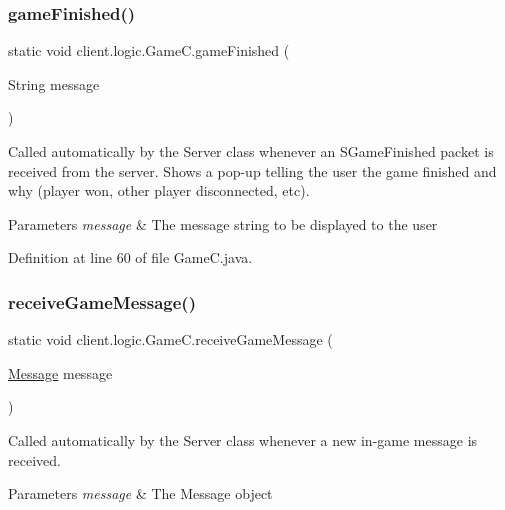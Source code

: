 \subsubsection{\texorpdfstring{game\+Finished()}{gameFinished()}}
{\footnotesize\ttfamily static void client.\+logic.\+Game\+C.\+game\+Finished (\begin{DoxyParamCaption}\item[{String}]{message }\end{DoxyParamCaption})\hspace{0.3cm}{\ttfamily [static]}}

Called automatically by the {\ttfamily Server} class whenever an {\ttfamily S\+Game\+Finished} packet is received from the server. Shows a pop-\/up telling the user the game finished and why (player won, other player disconnected, etc).


\begin{DoxyParams}{Parameters}
{\em message} & The message string to be displayed to the user \\
\hline
\end{DoxyParams}


Definition at line 60 of file Game\+C.\+java.

\hypertarget{classclient_1_1logic_1_1_game_c_a70979b2783537bb175c0a8926680e236}{}\label{classclient_1_1logic_1_1_game_c_a70979b2783537bb175c0a8926680e236} 
\subsubsection{\texorpdfstring{receive\+Game\+Message()}{receiveGameMessage()}}
{\footnotesize\ttfamily static void client.\+logic.\+Game\+C.\+receive\+Game\+Message (\begin{DoxyParamCaption}\item[{\hyperlink{classsharedlib_1_1tuples_1_1_message}{Message}}]{message }\end{DoxyParamCaption})\hspace{0.3cm}{\ttfamily [static]}}

Called automatically by the {\ttfamily Server} class whenever a new in-\/game message is received.


\begin{DoxyParams}{Parameters}
{\em message} & The Message object \\
\hline
\end{DoxyParams}


